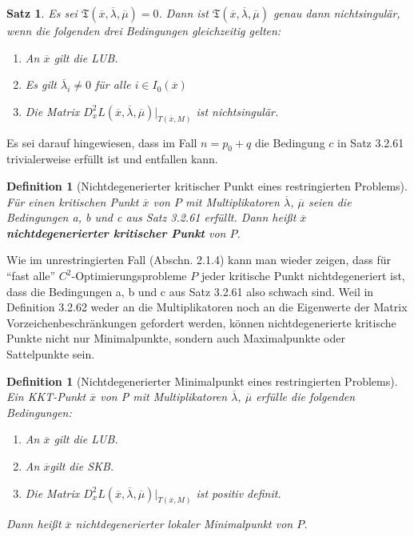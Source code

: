\documentclass[11pt]{scrreprt}
\newcounter{thm}
\theoremstyle{thmstyle}
\numberwithin{thm}{section}
\newtheorem{definition}[thm]{Definition}
\newtheorem{satz}[thm]{Satz}
\begin{document}
\begin{satz}
	Es sei $\mathfrak{T}(\overline{x}, \overline{\lambda}, \overline{\mu}) = 0$. Dann ist $\mathfrak{T}(\overline{x}, \overline{\lambda}, \overline{\mu})$ genau dann nichtsingulär, wenn die folgenden drei Bedingungen gleichzeitig gelten:
	\begin{enumerate}[label=\alph*\upshape)]
		\item An $\overline{x}$ gilt die LUB.
		\item Es gilt $\overline{\lambda}_i \neq 0$ für alle $i \in I_0(\overline{x})$
		\item Die Matrix $D_x^2 L(\overline{x}, \overline{\lambda}, \overline{\mu})|_{T(\overline{x}, M)}$ ist nichtsingulär.
	\end{enumerate}
\end{satz}

Es sei darauf hingewiesen, dass im Fall $n = p_0 + q$ die Bedingung $c$ in Satz 3.2.61 trivialerweise erfüllt ist und entfallen kann.

\begin{definition}[Nichtdegenerierter kritischer Punkt eines restringierten Problems]
	Für einen kritischen Punkt $\overline{x}$ von $P$ mit Multiplikatoren $\overline{\lambda}$, $\overline{\mu}$ seien die Bedingungen a, b und c aus Satz 3.2.61 erfüllt. Dann heißt $\overline{x}$ \textbf{nichtdegenerierter kritischer Punkt} von $P$.
\end{definition}

Wie im unrestringierten Fall (Abschn. 2.1.4) kann man wieder zeigen, dass für \enquote{fast alle} $C^2$-Optimierungsprobleme $P$ jeder kritische Punkt nichtdegeneriert ist, dass die Bedingungen a, b und c aus Satz 3.2.61 also schwach sind. Weil in Definition 3.2.62 weder an die Multiplikatoren noch an die Eigenwerte der Matrix Vorzeichenbeschränkungen gefordert werden, können nichtdegenerierte kritische Punkte nicht nur Minimalpunkte, sondern auch Maximalpunkte oder Sattelpunkte sein.

\setcounter{thm}{64}


\begin{definition}[Nichtdegenerierter Minimalpunkt eines restringierten Problems]
	Ein KKT-Punkt $\overline{x}$ von P mit Multiplikatoren $\overline{\lambda}$, $\overline{\mu}$ erfülle die folgenden Bedingungen:
	\begin{enumerate}[label=\alph*\upshape)]
		\item An $\overline{x}$ gilt die LUB.
		\item An $\overline{x}$gilt die SKB.
		\item Die Matrix $D_x^2 L(\overline{x}, \overline{\lambda}, \overline{\mu}) |_{T(\overline{x},M)}$ ist positiv definit.
	\end{enumerate}
	Dann heißt $\overline{x}$ nichtdegenerierter lokaler Minimalpunkt von $P$.
\end{definition}
\end{document}
